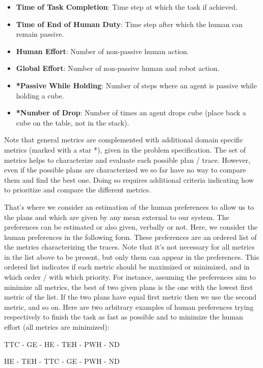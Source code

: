 \begin{itemize}
    \item \textbf{Time of Task Completion}: Time step at which the task if achieved.
    \item \textbf{Time of End of Human Duty}: Time step after which the human can remain passive.
    \item \textbf{Human Effort}: Number of non-passive human action.
    \item \textbf{Global Effort}: Number of non-passive human and robot action.
    \item \textbf{*Passive While Holding}: Number of steps where an agent is passive while holding a cube.
    \item \textbf{*Number of Drop}: Number of times an agent drops cube (place back a cube on the table, not in the stack).
\end{itemize}

Note that general metrics are complemented with additional domain specific metrics (marked with a star *), given in the problem specification. The set of metrics helps to characterize and evaluate each possible plan / trace. However, even if the possible plans are characterized we so far have no way to compare them and find the best one. Doing so requires additional criteria indicating how to prioritize and compare the different metrics.

That's where we consider an estimation of the human preferences to allow us to the plans and which are given by any mean external to our system. The preferences can be estimated or also given, verbally or not. Here, we consider the human preferences in the following form. These preferences are an ordered list of the metrics characterizing the traces. Note that it's not necessary for all metrics in the list above to be present, but only them can appear in the preferences. This ordered list indicates if each metric should be maximized or minimized, and in which order / with which priority. For instance, assuming the preferences aim to minimize all metrics, the best of two given plans is the one with the lowest first metric of the list. If the two plans have equal first metric then we use the second metric, and so on. Here are two arbitrary examples of human preferences trying respectively to finish the task as fast as possible and to minimize the human effort (all metrics are minimized):

TTC - GE - HE - TEH - PWH - ND 

HE - TEH - TTC - GE - PWH - ND 

